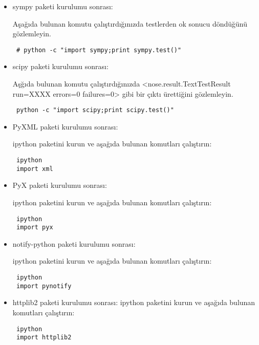 \documentclass[a4paper,10pt]{article}
\begin{document}
\begin{itemize}
\item sympy paketi kurulumu sonrası:

Aşağıda bulunan komutu çalıştırdığınızda testlerden ok sonucu döndüğünü gözlemleyin.
\begin{verbatim}
 # python -c "import sympy;print sympy.test()"
\end{verbatim}

\item scipy paketi kurulumu sonrası:

Aşğıda bulunan komutu çalıştırdığınızda <nose.result.TextTestResult run=XXXX errors=0 failures=0> gibi bir çıktı ürettiğini gözlemleyin.
\begin{verbatim}
 python -c "import scipy;print scipy.test()"
\end{verbatim}

\item PyXML paketi kurulumu sonrası:

ipython paketini kurun ve aşağıda bulunan komutları çalıştırın:
\begin{verbatim}
 ipython
 import xml
\end{verbatim}


\item PyX paketi kurulumu sonrası:

ipython paketini kurun ve aşağıda bulunan komutları çalıştırın:
\begin{verbatim}
 ipython
 import pyx
\end{verbatim}

\item notify-python paketi kurulumu sonrası:

ipython paketini kurun ve aşağıda bulunan komutları çalıştırın:
\begin{verbatim}
 ipython
 import pynotify
\end{verbatim}


\item httplib2 paketi kurulumu sonrası:
ipython paketini kurun ve aşağıda bulunan komutları çalıştırın:
\begin{verbatim}
 ipython
 import httplib2
\end{verbatim}


\end{itemize}
\end{document}
